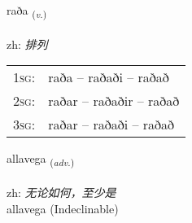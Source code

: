 \documentclass[frontgrid, backgrid]{flacards}\usepackage[]{graphicx}\usepackage[]{color}
\begin{document}
\renewcommand{\flhead}{\vskip5pt \fboxsep=0pt {\small\bfseries\footnotesize Sagnorð | 动词}}
\renewcommand{\fcfoot}{\vskip5pt \fboxsep=0pt \hspace{2pt}{\small\bfseries\footnotesize 2K}}

\renewcommand{\blhead}{\vskip5pt {\small\bfseries\footnotesize Sagnorð | 动词 }}
\renewcommand{\bcfoot}{\vskip5pt \hspace{2pt}{\small\bfseries\footnotesize 2K}}


{raða \small{\textsubscript{(\textit{v.})}} \\[1ex] %
\textphonetic{[raːða]} \\
zh: \emph{排列} \\  [2ex]
\renewcommand*{\arraystretch}{0.8}
\begin{tabular}{p{1cm}l}
\textsc{1sg}: & raða -- raðaði -- raðað \\ 
\textsc{2sg}: & raðar -- raðaðir -- raðað \\ 
\textsc{3sg}: & raðar -- raðaði -- raðað \\ 
\end{tabular}
}


\renewcommand{\flhead}{\vskip5pt \fboxsep=0pt {\small\bfseries\footnotesize Atviksorð | 副词}}
\renewcommand{\fcfoot}{\vskip5pt \fboxsep=0pt \hspace{2pt}{\small\bfseries\footnotesize 2K}}

\renewcommand{\blhead}{\vskip5pt {\small\bfseries\footnotesize Atviksorð | 副词 }}
\renewcommand{\bcfoot}{\vskip5pt \hspace{2pt}{\small\bfseries\footnotesize 2K}}


{allavega \small{\textsubscript{(\textit{adv.})}} \\[1ex]
\textphonetic{[atlavɛɣa]} \\
zh: \emph{无论如何，至少是} \\  [2ex]
allavega (Indeclinable)}

\renewcommand{\flhead}{\vskip5pt \fboxsep=0pt {\small\bfseries\footnotesize Nafnorð | 名词}}
\renewcommand{\fcfoot}{\vskip5pt \fboxsep=0pt \hspace{2pt}{\small\bfseries\footnotesize 2K}}
\end{document}
